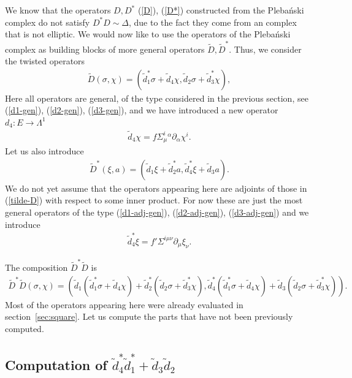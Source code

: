 \documentclass[10pt]{report}
\newcommand{\pleb}[0]{Pleba\'nski}
\theoremstyle{definition}
\begin{document}
We know that the operators $D,D^*$  (\ref{D}), (\ref{D*}) constructed from the \pleb{} complex do not satisfy $D^* D\sim\Delta$, due to the fact they come from an complex that is not elliptic. We would now like to use the operators of the \pleb{} complex as building blocks of more general operators $\tilde{D},\tilde{D}^*$. Thus, we consider the twisted operators
\begin{align}\label{tilde-D}
\tilde{D}(\sigma,\chi) = (\tilde{d}_1^* \sigma + \tilde{d}_4 \chi, \tilde{d}_2 \sigma + \tilde{d}_3^*\chi),
\end{align}
Here all operators are general, of the type considered in the previous section, see (\ref{d1-gen}), (\ref{d2-gen}), (\ref{d3-gen}), and we have introduced a new operator $d_4:E\to \Lambda^1$
\begin{align}
\tilde{d}_4 \chi=f \Sigma^i_\mu{}^\alpha \partial_\alpha \chi^i .
 \end{align}
 Let us also introduce
\begin{align}
\tilde{D}^*(\xi, a) = (\tilde{d}_1 \xi + \tilde{d}_2^* a, \tilde{d}_4^* \xi + \tilde{d}_3 a).
\end{align}
We do not yet assume that the operators appearing here are adjoints of those in (\ref{tilde-D}) with respect to some inner product. For now these are just the most general operators of the type (\ref{d1-adj-gen}), (\ref{d2-adj-gen}), (\ref{d3-adj-gen}) and we introduce
\begin{align}
\tilde{d}_4^* \xi = f' \Sigma^{i\mu\nu} \partial_\mu\xi_\nu.
\end{align}

The composition $\tilde{D}^* \tilde{D}$ is 
\begin{align}
\tilde{D}^* \tilde{D}(\sigma,\chi) = (\tilde{d}_1 (\tilde{d}_1^* \sigma + \tilde{d}_4 \chi) + \tilde{d}_2^* (\tilde{d}_2 \sigma + \tilde{d}_3^*\chi), \tilde{d}_4^* (\tilde{d}_1^* \sigma + \tilde{d}_4 \chi)+ \tilde{d}_3 (\tilde{d}_2 \sigma + \tilde{d}_3^*\chi)).
\end{align}
Most of the operators appearing here were already evaluated in section\ \ref{sec:square}. Let us compute the parts that have not been previously computed.

\subsection{\texorpdfstring{Computation of $\tilde{d}_4^* \tilde{d}_1^* +\tilde{d}_3 \tilde{d}_2$}{}}
\end{document}
